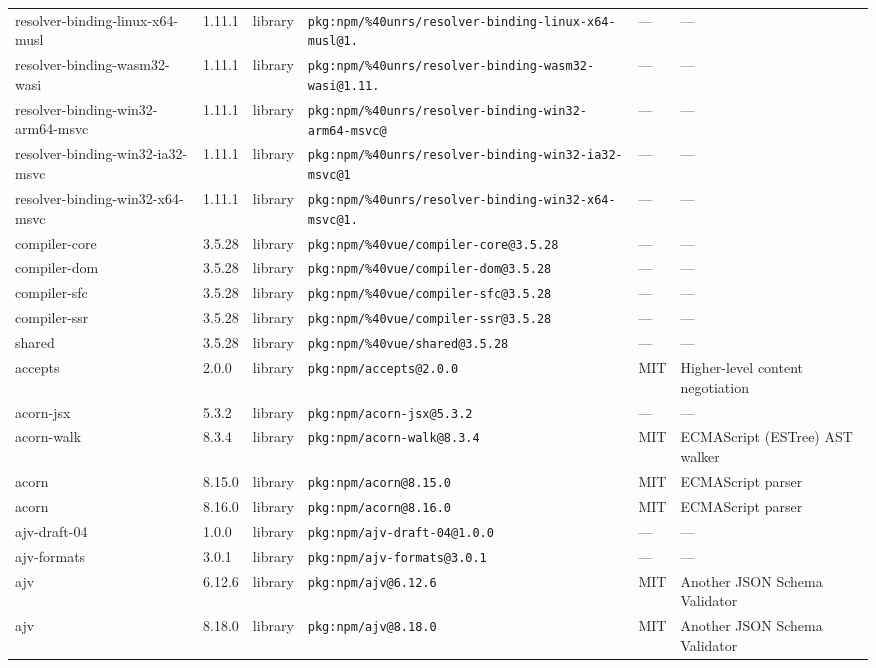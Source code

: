 \documentclass[11pt]{article}
\begin{document}
\begin{longtable}{|l|l|l|p{2.2cm}|l|p{4cm}|}
resolver-binding-linux-x64-musl & 1.11.1 & library & \texttt{pkg:npm/\%40unrs/resolver-binding-linux-x64-musl@1.} & — & — \\
resolver-binding-wasm32-wasi & 1.11.1 & library & \texttt{pkg:npm/\%40unrs/resolver-binding-wasm32-wasi@1.11.} & — & — \\
resolver-binding-win32-arm64-msvc & 1.11.1 & library & \texttt{pkg:npm/\%40unrs/resolver-binding-win32-arm64-msvc@} & — & — \\
resolver-binding-win32-ia32-msvc & 1.11.1 & library & \texttt{pkg:npm/\%40unrs/resolver-binding-win32-ia32-msvc@1} & — & — \\
resolver-binding-win32-x64-msvc & 1.11.1 & library & \texttt{pkg:npm/\%40unrs/resolver-binding-win32-x64-msvc@1.} & — & — \\
compiler-core & 3.5.28 & library & \texttt{pkg:npm/\%40vue/compiler-core@3.5.28} & — & — \\
compiler-dom & 3.5.28 & library & \texttt{pkg:npm/\%40vue/compiler-dom@3.5.28} & — & — \\
compiler-sfc & 3.5.28 & library & \texttt{pkg:npm/\%40vue/compiler-sfc@3.5.28} & — & — \\
compiler-ssr & 3.5.28 & library & \texttt{pkg:npm/\%40vue/compiler-ssr@3.5.28} & — & — \\
shared & 3.5.28 & library & \texttt{pkg:npm/\%40vue/shared@3.5.28} & — & — \\
accepts & 2.0.0 & library & \texttt{pkg:npm/accepts@2.0.0} & MIT & Higher-level content negotiation \\
acorn-jsx & 5.3.2 & library & \texttt{pkg:npm/acorn-jsx@5.3.2} & — & — \\
acorn-walk & 8.3.4 & library & \texttt{pkg:npm/acorn-walk@8.3.4} & MIT & ECMAScript (ESTree) AST walker \\
acorn & 8.15.0 & library & \texttt{pkg:npm/acorn@8.15.0} & MIT & ECMAScript parser \\
acorn & 8.16.0 & library & \texttt{pkg:npm/acorn@8.16.0} & MIT & ECMAScript parser \\
ajv-draft-04 & 1.0.0 & library & \texttt{pkg:npm/ajv-draft-04@1.0.0} & — & — \\
ajv-formats & 3.0.1 & library & \texttt{pkg:npm/ajv-formats@3.0.1} & — & — \\
ajv & 6.12.6 & library & \texttt{pkg:npm/ajv@6.12.6} & MIT & Another JSON Schema Validator \\
ajv & 8.18.0 & library & \texttt{pkg:npm/ajv@8.18.0} & MIT & Another JSON Schema Validator \\

\end{longtable}
\end{document}
